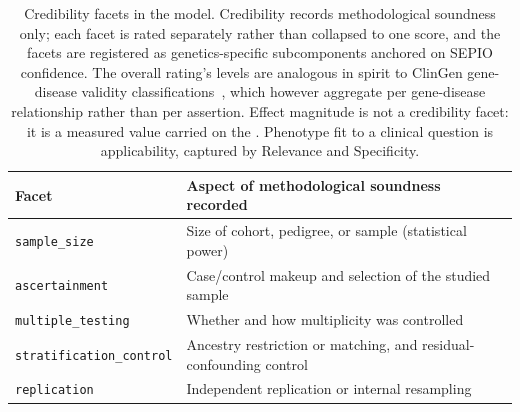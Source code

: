 \begin{table}[H]
    \centering
    \caption[Credibility facets]{Credibility facets in the \GeneticEvidence{} model.
    Credibility records methodological soundness only; each facet is
    rated separately rather than collapsed to one score, and the facets
    are registered as genetics-specific subcomponents anchored on SEPIO
    confidence. The overall rating's levels are
    analogous in spirit to ClinGen gene-disease validity
    classifications~\cite{clingen2018}, which however aggregate per
    gene-disease relationship rather than per assertion. Effect
    magnitude is not a credibility facet: it is a measured value carried
    on the \GeneticEvidenceVariable{}. Phenotype fit to a clinical
    question is applicability, captured by Relevance and Specificity.}
    \label{tab:credibility-facets}
    \small
    \begin{tabularx}{\linewidth}{@{}lX@{}}
\toprule
Facet & Aspect of methodological soundness recorded \\
\midrule
\texttt{sample\_size}            & Size of cohort, pedigree, or sample (statistical power) \\
\texttt{ascertainment}           & Case/control makeup and selection of the studied sample \\
\texttt{multiple\_testing}       & Whether and how multiplicity was controlled \\
\texttt{stratification\_control} & Ancestry restriction or matching, and residual-confounding control \\
\texttt{replication}             & Independent replication or internal resampling \\
\bottomrule
    \end{tabularx}
\end{table}


